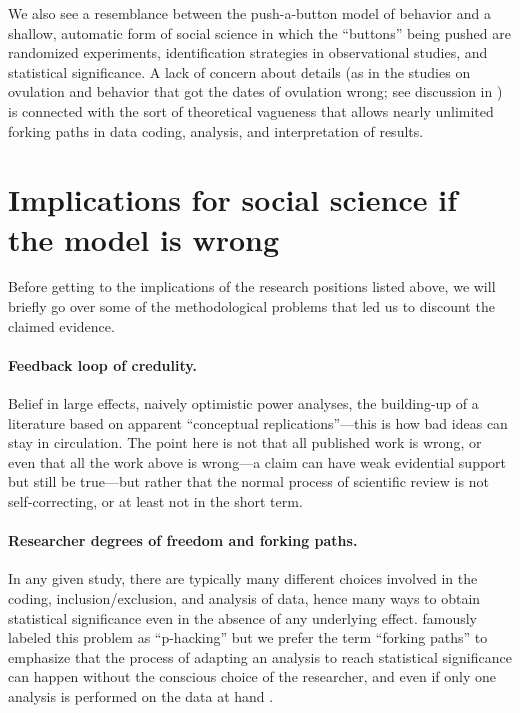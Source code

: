 \documentclass[11pt,letterpaper]{article}
\begin{document}
We also see a resemblance between the push-a-button model of behavior and a
shallow, automatic form of social science in which the ``buttons'' being pushed
are randomized experiments, identification strategies in observational studies,
and statistical significance. A lack of concern about details (as in the studies
on ovulation and behavior that got the dates of ovulation wrong; see discussion
in \citealt{gelman2015b}) is connected with the sort of theoretical vagueness
that allows nearly unlimited forking paths in data coding, analysis, and
interpretation of results.

\section{Implications for social science if the model is wrong}

Before getting to the implications of the research positions listed above, we
will briefly go over some of the methodological problems that led us to discount
the claimed evidence.

\paragraph{Feedback loop of credulity.} Belief in large effects, naively
optimistic power analyses, the building-up of a literature based on apparent
``conceptual replications''---this is how bad ideas can stay in circulation. The
point here is not that all published work is wrong, or even that all the work
above is wrong---a claim can have weak evidential support but still be
true---but rather that the normal process of scientific review is not
self-correcting, or at least not in the short term.

\paragraph{Researcher degrees of freedom and forking paths.} In any given study,
there are typically many different choices involved in the coding,
inclusion/exclusion, and analysis of data, hence many ways to obtain statistical
significance even in the absence of any underlying effect. \citet*{simmons2011}
famously labeled this problem as ``p-hacking'' but we prefer the term ``forking
paths'' to emphasize that the process of adapting an analysis to reach
statistical significance can happen without the conscious choice of the
researcher, and even if only one analysis is performed on the data at hand
\citep{gelman2014}.
\end{document}
